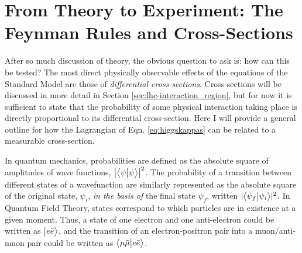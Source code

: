 \section{From Theory to Experiment: The Feynman Rules and Cross-Sections} \label{sec:feyn_rules}
    
    After so much discussion of theory, the obvious question to ask is: how can this be tested?
    The most direct physically observable effects of the equations of the Standard Model are those of \textit{differential cross-sections}.
    Cross-sections will be discussed in more detail in Section \ref{sec:lhc-interaction_region},
        but for now it is sufficient to state that the probability of some physical interaction taking place
        is directly proportional to its differential cross-section.
    Here I will provide a general outline for how the Lagrangian of Eqn. \ref{eq:higgskappas} can be related to a measurable cross-section.

    In quantum mechanics, probabilities are defined as the absolute square of amplitudes of wave functions, $\left|\big< \psi \big| \psi \big>\right|^2$.
    The probability of a transition between different states of a wavefunction are similarly represented
        as the absolute square of the original state, $\psi_i$, \textit{in the basis of} the final state $\psi_f$,
        written $ |\big< \psi_f \big| \psi_i \big>|^2$.
    In Quantum Field Theory, states correspond to which particles are in existence at a given moment.
    Thus, a state of one electron and one anti-electron could be written as $\big| e \bar{e} \big>$,
        and the transition of an electron-positron pair into a muon/anti-muon pair could be written
        as $\big< \mu \bar{\mu} \big| e \bar{e} \big>$.

